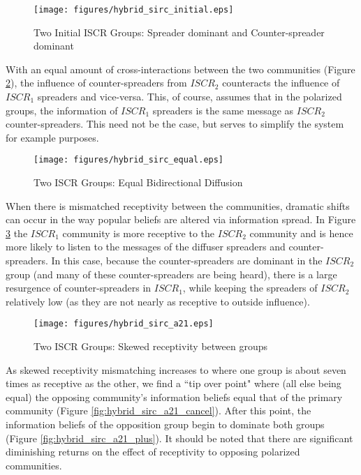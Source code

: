 \begin{figure}[!htbp] \centering
  \texttt{[image: figures/hybrid\_sirc\_initial.eps]}
  \caption{Two Initial ISCR Groups: Spreader dominant and Counter-spreader dominant}
  \label{fig:hybrid_sirc_initial}
\end{figure}

With an equal amount of cross-interactions between the two communities (Figure \ref{fig:hybrid_sirc_equal}), the influence of counter-spreaders from $ISCR_2$ counteracts the influence of $ISCR_1$ spreaders and vice-versa. This, of course, assumes that in the polarized groups, the information of $ISCR_1$ spreaders is the same message as $ISCR_2$ counter-spreaders. This need not be the case, but serves to simplify the system for example purposes. 

\begin{figure}[!htbp] \centering
  \texttt{[image: figures/hybrid\_sirc\_equal.eps]}
  \caption{Two ISCR Groups: Equal Bidirectional Diffusion}
  \label{fig:hybrid_sirc_equal}
\end{figure}

When there is mismatched receptivity between the communities, dramatic shifts can occur in the way popular beliefs are altered via information spread. In Figure \ref{fig:hybrid_sirc_a21} the $ISCR_1$ community is more receptive to the $ISCR_2$ community and is hence more likely to listen to the messages of the diffuser spreaders and counter-spreaders. In this case, because the counter-spreaders are dominant in the $ISCR_2$ group (and many of these counter-spreaders are being heard), there is a large resurgence of counter-spreaders in $ISCR_1$, while keeping the spreaders of $ISCR_2$ relatively low (as they are not nearly as receptive to outside influence). 

\begin{figure}[!htbp] \centering
  \texttt{[image: figures/hybrid\_sirc\_a21.eps]}
  \caption{Two ISCR Groups: Skewed receptivity between groups}
  \label{fig:hybrid_sirc_a21}
\end{figure}

As skewed receptivity mismatching increases to where one group is about seven times as receptive as the other, we find a ``tip over point" where (all else being equal) the opposing community's information beliefs equal that of the primary community (Figure \ref{fig:hybrid_sirc_a21_cancel}). After this point, the information beliefs of the opposition group begin to dominate both groups (Figure \ref{fig:hybrid_sirc_a21_plus}). It should be noted that there are significant diminishing returns on the effect of receptivity to opposing polarized communities. 

